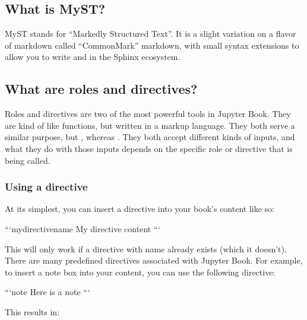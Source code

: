\documentclass[letterpaper,10pt,english]{jupyterBook}
\begin{document}
\subsection{What is MyST?}
\label{\detokenize{markdown:what-is-myst}}
\sphinxAtStartPar
MyST stands for “Markedly Structured Text”. It
is a slight variation on a flavor of markdown called “CommonMark” markdown,
with small syntax extensions to allow you to write  and 
in the Sphinx ecosystem.


\subsection{What are roles and directives?}
\label{\detokenize{markdown:what-are-roles-and-directives}}
\sphinxAtStartPar
Roles and directives are two of the most powerful tools in Jupyter Book. They
are kind of like functions, but written in a markup language. They both
serve a similar purpose, but , whereas
. They both accept different kinds of inputs,
and what they do with those inputs depends on the specific role or directive
that is being called.


\subsubsection{Using a directive}
\label{\detokenize{markdown:using-a-directive}}
\sphinxAtStartPar
At its simplest, you can insert a directive into your book’s content like so:

\begin{sphinxVerbatim}[commandchars=\\\{\}]
```\PYGZob{}mydirectivename\PYGZcb{}
My directive content
```
\end{sphinxVerbatim}

\sphinxAtStartPar
This will only work if a directive with name  already exists
(which it doesn’t). There are many pre\sphinxhyphen{}defined directives associated with
Jupyter Book. For example, to insert a note box into your content, you can
use the following directive:

\begin{sphinxVerbatim}[commandchars=\\\{\}]
```\PYGZob{}note\PYGZcb{}
Here is a note
```
\end{sphinxVerbatim}

\sphinxAtStartPar
This results in:
\end{document}
